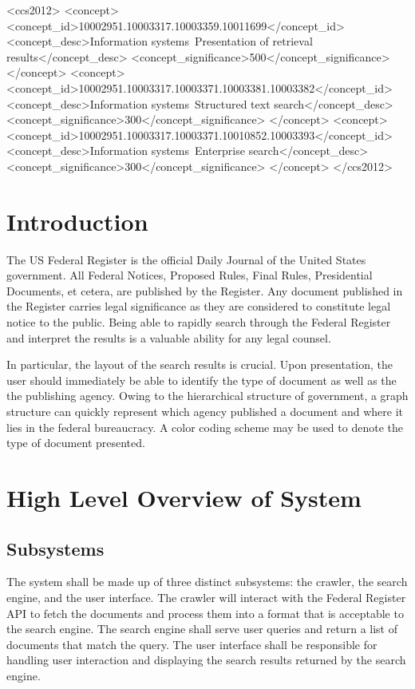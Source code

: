 \documentclass{sig-alternate-05-2015}
\begin{document}
\begin{CCSXML}
<ccs2012>
<concept>
<concept_id>10002951.10003317.10003359.10011699</concept_id>
<concept_desc>Information systems~Presentation of retrieval results</concept_desc>
<concept_significance>500</concept_significance>
</concept>
<concept>
<concept_id>10002951.10003317.10003371.10003381.10003382</concept_id>
<concept_desc>Information systems~Structured text search</concept_desc>
<concept_significance>300</concept_significance>
</concept>
<concept>
<concept_id>10002951.10003317.10003371.10010852.10003393</concept_id>
<concept_desc>Information systems~Enterprise search</concept_desc>
<concept_significance>300</concept_significance>
</concept>
</ccs2012>
\end{CCSXML}

\printccsdesc



\section{Introduction}
The US Federal Register is the official Daily Journal of the United States government. All Federal Notices, Proposed Rules, Final Rules, Presidential Documents, et cetera, are published by the Register. Any document published in the Register carries legal significance as they are considered to constitute legal notice to the public. Being able to rapidly search through the Federal Register and interpret the results is a valuable ability for any legal counsel. 

In particular, the layout of the search results is crucial. Upon presentation, the user should immediately be able to identify the type of document as well as the the publishing agency. Owing to the hierarchical structure of government, a graph structure can quickly represent which agency published a document and where it lies in the federal bureaucracy. A color coding scheme may be used to denote the type of document presented.

\section{High Level Overview of System}
\subsection{Subsystems}
The system shall be made up of three distinct subsystems: the crawler, the search engine, and the user interface. The crawler will interact with the Federal Register API to fetch the documents and process them into a format that is acceptable to the search engine. The search engine shall serve user queries and return a list of documents that match the query. The user interface shall be responsible for handling user interaction and displaying the search results returned by the search engine.
\end{document}
